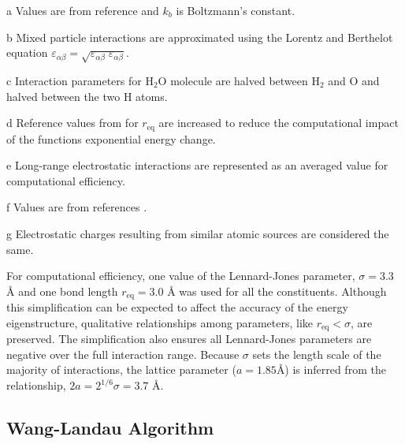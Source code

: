 \documentclass[
journal=jcisd8, %
manuscript=article,
layout=twocolumn   %
]{achemso}
\begin{document}
\begin{table*}[htbp]
\begin{threeparttable}
\begin{tablenotes}
  \item[a] Values are from reference \cite{Wilhelm1971,Poling2001,Li2015} and $k_b$ is Boltzmann's constant.
  \item[b] Mixed particle interactions are approximated using the Lorentz and Berthelot equation $\varepsilon _{\alpha\beta} =\sqrt{\varepsilon _{\alpha\beta}\;\varepsilon _{\alpha\beta}}$.
  \item[c] Interaction parameters for H$_2$O molecule are halved between H$_2$ and O and halved between the two H atoms.
  \item[d] Reference values from \cite{Rossi2011} for $r_{\text{eq}}$ are increased to reduce the computational impact of the functions exponential energy change.
  \item[e] Long-range electrostatic interactions are represented as an averaged value for computational efficiency.
  \item[f] Values are from references \cite{Jorgensen1983,Laury2015}.
  \item[g] Electrostatic charges resulting from similar atomic sources are considered the same.
\end{tablenotes}
\end{threeparttable}

\end{table*}

For computational efficiency, one value of the Lennard-Jones parameter, $\sigma=3.3$ {\AA } and one bond length $r_{\text{eq}}= 3.0$ {\AA } was used for all the constituents. Although this simplification can be expected to affect the accuracy of the energy eigenstructure, qualitative relationships among parameters, like $r_{\text{eq}}< \sigma$, are preserved. The simplification also ensures all Lennard-Jones parameters are negative over the full interaction range. Because $\sigma$ sets the length scale of the majority of interactions, the lattice parameter ($a=1.85$\AA) is inferred from the relationship, $2a=2^{1/6}\sigma=3.7$ \AA.



\subsection{Wang-Landau Algorithm}\label{SectionIIB}
\end{document}
